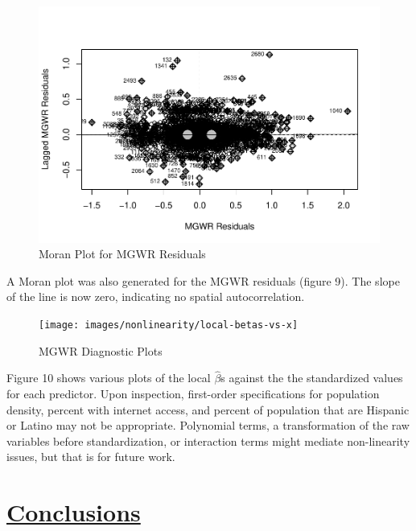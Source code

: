\documentclass[
]{article}
\begin{document}
\newpage

\begin{figure}[H]

{\centering \includegraphics[width=1\linewidth]{final-project-write-up-nathan-nguyen_files/figure-latex/unnamed-chunk-21-1} 

}

\caption{Moran Plot for MGWR Residuals}\label{fig:unnamed-chunk-21}
\end{figure}

A Moran plot was also generated for the MGWR residuals (figure 9). The
slope of the line is now zero, indicating no spatial autocorrelation.

\newpage

\begin{figure}[H]

{\centering \texttt{[image: images/nonlinearity/local-betas-vs-x]} 

}

\caption{MGWR Diagnostic Plots}\label{fig:unnamed-chunk-22}
\end{figure}

Figure 10 shows various plots of the local \(\hat{\beta}\)s against the
the standardized values for each predictor. Upon inspection, first-order
specifications for population density, percent with internet access, and
percent of population that are Hispanic or Latino may not be
appropriate. Polynomial terms, a transformation of the raw variables
before standardization, or interaction terms might mediate non-linearity
issues, but that is for future work.

\newpage

\section{\texorpdfstring{\ul{Conclusions}}{Conclusions}}\label{conclusions}
\end{document}
